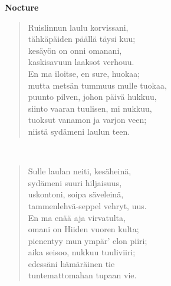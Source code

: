 \noindent\begin{minipage}{\linewidth}
\vspace{5pt}
\parbox[t]{0.85\linewidth}{\raggedright {\large\bf Nocture}\\[6pt]}
\begin{verse}
	Ruislinnun laulu korvissani,\\
	tähkäpäiden päällä täysi kuu;\\
	kesäyön on onni omanani,\\
	kaskisavuun laaksot verhouu.\\
	En ma iloitse, en sure, huokaa;\\
	mutta metsän tummuus mulle tuokaa,\\
	puunto pilven, johon päivä hukkuu,\\
	siinto vaaran tuulisen, mi nukkuu,\\
	tuoksut vanamon ja varjon veen;\\
	niistä sydämeni laulun teen.\\
\end{verse}
\end{minipage}\\[10pt]
\noindent\begin{minipage}{\linewidth}
\begin{verse}
	Sulle laulan neiti, kesäheinä,\\
	sydämeni suuri hiljaisuus,\\
	uskontoni, soipa säveleinä,\\
	tammenlehvä-seppel vehryt, uus.\\
	En ma enää aja virvatulta,\\
	omani on Hiiden vuoren kulta;\\
	pienentyy mun ympär' elon piiri;\\
	aika seisoo, nukkuu tuuliviiri;\\
	edessäni hämäräinen tie\\
	tuntemattomahan tupaan vie.\\
\end{verse}
\end{minipage}\\[10pt]
%
%

